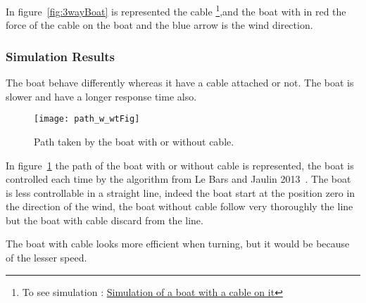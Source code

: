 In figure~\ref{fig:3wayBoat} is represented the cable \footnote{To see simulation : \href{https://www.youtube.com/watch?v=1nrbdikXr8A}{Simulation of a boat with a cable on it}},and the boat with in red the force of the cable on the boat and the blue arrow is the wind direction.

\subsubsection{Simulation Results}

The boat behave differently whereas it have a cable attached or not. The boat is slower and have a longer response time also.

\begin{figure}[H]
\centering
    \texttt{[image: path\_w\_wtFig]}
    \caption{Path taken by the boat with or without cable.}
    \label{fig:pathBoat}
\end{figure}

In figure~\ref{fig:pathBoat} the path of the boat with or without cable is represented, the boat is controlled each time by the algorithm from Le Bars and Jaulin 2013~\cite{LeBars2013}. The boat is less controllable in a straight
line, indeed the boat start at the position zero in the direction of the wind, the boat without cable follow very thoroughly the line but the boat with cable discard from the line.

The boat with cable looks more efficient when turning, but it would be because of the lesser speed.

